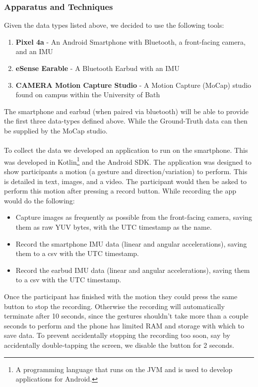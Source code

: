 \subsubsection{Apparatus and Techniques}
Given the data types listed above, we decided to use the following tools:
\begin{enumerate}
    \item \textbf{Pixel 4a} - An Android Smartphone with Bluetooth, a front-facing camera, and an IMU
    \item \textbf{eSense Earable} - A Bluetooth Earbud with an IMU
    \item \textbf{CAMERA Motion Capture Studio} - A Motion Capture (MoCap) studio found on campus within the University of Bath
\end{enumerate}
The smartphone and earbud (when paired via bluetooth) will be able to provide the first three data-types defined above. While the Ground-Truth data can then be supplied by the MoCap studio.
\\\\
To collect the data we developed an application to run on the smartphone. 
This was developed in Kotlin\footnote{A programming language that runs on the JVM and is used to develop applications for Android.} and the Android SDK.
The application was designed to show participants a motion (a gesture and direction/variation) to perform. This is detailed in text, images, and a video. 
The participant would then be asked to perform this motion after pressing a record button. While recording the app would do the following:
\begin{itemize}
    \item Capture images as frequently as possible from the front-facing camera, saving them as raw YUV bytes, with the UTC timestamp as the name.
    \item Record the smartphone IMU data (linear and angular accelerations), saving them to a csv with the UTC timestamp.
    \item Record the earbud IMU data (linear and angular accelerations), saving them to a csv with the UTC timestamp.
\end{itemize}
Once the participant has finished with the motion they could press the same button to stop the recording. Otherwise the recording will automatically terminate after 10 seconds, since the gestures shouldn't take more than a couple seconds to perform and the phone has limited RAM and storage with which to save data.
To prevent accidentally stopping the recording too soon, say by accidentally double-tapping the screen, we disable the button for 2 seconds.

